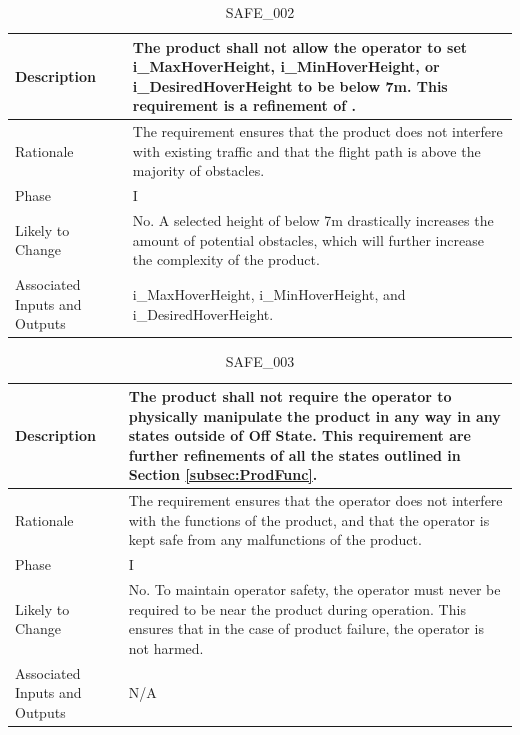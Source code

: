 \documentclass{article}
\begin{document}
\begin{table}[!h]
\begin{center}
\caption {SAFE\_002} 
\label{SAFE_002}
\begin{tabular}{ | m{3cm} | m{11cm} | }
\hline
Description & The product shall not allow the operator to set i\_MaxHoverHeight, i\_MinHoverHeight, or i\_DesiredHoverHeight to be below 7m. This requirement is a refinement of \nameref{SAFE_001}. \\
\hline
Rationale & The requirement ensures that the product does not interfere with existing traffic and that the flight path is above the majority of obstacles.  \\
\hline
Phase & I \\
\hline
Likely to Change & No. A selected height of below 7m drastically increases the amount of potential obstacles, which will further increase the complexity of the product. \\
\hline
Associated Inputs and Outputs & i\_MaxHoverHeight, i\_MinHoverHeight, and i\_DesiredHoverHeight.  \\
\hline
\end{tabular}
\end{center}
\end{table}

\begin{table}[!h]
\begin{center}
\caption {SAFE\_003} 
\label{SAFE_003}
\begin{tabular}{ | m{3cm} | m{11cm} | }
\hline
Description & The product shall not require the operator to physically manipulate the product in any way in any states outside of Off State. This requirement are further refinements of all the states outlined in Section \ref{subsec:ProdFunc}.  \\
\hline
Rationale & The requirement ensures that the operator does not interfere with the functions of the product, and that the operator is kept safe from any malfunctions of the product.  \\
\hline
Phase & I \\
\hline
Likely to Change & No. To maintain operator safety, the operator must never be required to be near the product during operation. This ensures that in the case of product failure, the operator is not harmed. \\
\hline
Associated Inputs and Outputs & N/A \\
\hline
\end{tabular}
\end{center}
\end{table}
\end{document}

